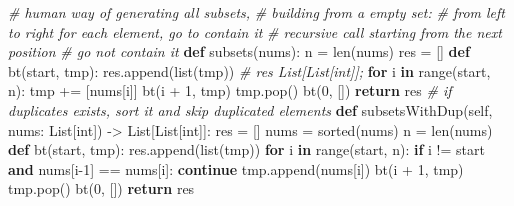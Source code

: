 \documentclass[
]{article}
\newenvironment{Shaded}{}{}
\newcommand{\BuiltInTok}[1]{#1}
\newcommand{\CommentTok}[1]{\textcolor[rgb]{0.38,0.63,0.69}{\textit{#1}}}
\newcommand{\ControlFlowTok}[1]{\textcolor[rgb]{0.00,0.44,0.13}{\textbf{#1}}}
\newcommand{\DecValTok}[1]{\textcolor[rgb]{0.25,0.63,0.44}{#1}}
\newcommand{\KeywordTok}[1]{\textcolor[rgb]{0.00,0.44,0.13}{\textbf{#1}}}
\newcommand{\NormalTok}[1]{#1}
\newcommand{\OperatorTok}[1]{\textcolor[rgb]{0.40,0.40,0.40}{#1}}
\newcommand{\VariableTok}[1]{\textcolor[rgb]{0.10,0.09,0.49}{#1}}
\begin{document}
\begin{Shaded}
\begin{Highlighting}[]
\CommentTok{\# human way of generating all subsets, }
\CommentTok{\# building from a empty set: }
\CommentTok{\# from left to right for each element, go to contain it }
\CommentTok{\# recursive call starting from the next position}
\CommentTok{\# go not contain it }
\KeywordTok{def}\NormalTok{ subsets(nums):}
\NormalTok{    n }\OperatorTok{=} \BuiltInTok{len}\NormalTok{(nums)}
\NormalTok{    res }\OperatorTok{=}\NormalTok{ []}
    \KeywordTok{def}\NormalTok{ bt(start, tmp):}
\NormalTok{        res.append(}\BuiltInTok{list}\NormalTok{(tmp))   }\CommentTok{\# res List[List[int]];}
        \ControlFlowTok{for}\NormalTok{ i }\KeywordTok{in} \BuiltInTok{range}\NormalTok{(start, n):}
\NormalTok{            tmp }\OperatorTok{+=}\NormalTok{ [nums[i]]}
\NormalTok{            bt(i }\OperatorTok{+} \DecValTok{1}\NormalTok{, tmp)}
\NormalTok{            tmp.pop()}
\NormalTok{    bt(}\DecValTok{0}\NormalTok{, [])}
    \ControlFlowTok{return}\NormalTok{ res}
\CommentTok{\# if duplicates exists, sort it and skip duplicated elements}
    \KeywordTok{def}\NormalTok{ subsetsWithDup(}\VariableTok{self}\NormalTok{, nums: List[}\BuiltInTok{int}\NormalTok{]) }\OperatorTok{{-}\textgreater{}}\NormalTok{ List[List[}\BuiltInTok{int}\NormalTok{]]:}
\NormalTok{        res }\OperatorTok{=}\NormalTok{ []}
\NormalTok{        nums }\OperatorTok{=} \BuiltInTok{sorted}\NormalTok{(nums)}
\NormalTok{        n }\OperatorTok{=} \BuiltInTok{len}\NormalTok{(nums)}
        \KeywordTok{def}\NormalTok{ bt(start, tmp):}
\NormalTok{            res.append(}\BuiltInTok{list}\NormalTok{(tmp))}
            \ControlFlowTok{for}\NormalTok{ i }\KeywordTok{in} \BuiltInTok{range}\NormalTok{(start, n):}
                \ControlFlowTok{if}\NormalTok{ i }\OperatorTok{!=}\NormalTok{ start }\KeywordTok{and}\NormalTok{ nums[i}\OperatorTok{{-}}\DecValTok{1}\NormalTok{] }\OperatorTok{==}\NormalTok{ nums[i]:}
                    \ControlFlowTok{continue}
\NormalTok{                tmp.append(nums[i])}
\NormalTok{                bt(i }\OperatorTok{+} \DecValTok{1}\NormalTok{, tmp)}
\NormalTok{                tmp.pop()}
\NormalTok{        bt(}\DecValTok{0}\NormalTok{, [])}
        \ControlFlowTok{return}\NormalTok{ res}
\end{Highlighting}
\end{Shaded}
\end{document}
